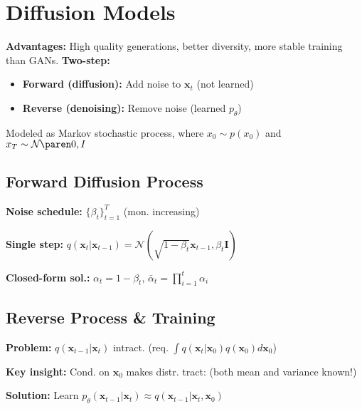 \section{Diffusion Models}

\textbf{Advantages:} High quality generations, better diversity, more stable training than GANs. \textbf{Two-step:}
\begin{itemize}
    \item \textbf{Forward (diffusion):} Add noise to $\mathbf{x}_t$ (not learned)
    \item \textbf{Reverse (denoising):} Remove noise (learned $p_\theta$)
\end{itemize}
Modeled as Markov stochastic process, where $x_0 \sim p(x_0)$ and $x_T \sim \Gauss{0,I}$

\subsection{Forward Diffusion Process}

\textbf{Noise schedule:} $\{\beta_t\}_{t=1}^T$ (mon. increasing)

\textbf{Single step:} $q(\mathbf{x}_t | \mathbf{x}_{t-1}) = \mathcal{N}(\sqrt{1-\beta_t} \mathbf{x}_{t-1}, \beta_t \mathbf{I})$

\textbf{Closed-form sol.:} $\alpha_t = 1 - \beta_t$, $\bar{\alpha}_t = \prod_{i=1}^t \alpha_i$



\subsection{Reverse Process \& Training}

\textbf{Problem:} $q(\mathbf{x}_{t-1} | \mathbf{x}_t)$ intract. ({\footnotesize req. $\int q(\mathbf{x}_t | \mathbf{x}_0) q(\mathbf{x}_0) d\mathbf{x}_0$)}

\textbf{Key insight:} Cond. on $\mathbf{x}_0$ makes distr. tract:
 (both mean and variance known!)

\textbf{Solution:} Learn $p_\theta(\mathbf{x}_{t-1} | \mathbf{x}_t) \approx q(\mathbf{x}_{t-1} | \mathbf{x}_t, \mathbf{x}_0)$

